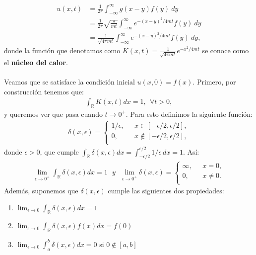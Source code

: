 \documentclass[12pt]{article}
\theoremstyle{definition}
\newcommand*{\field}[1]{\mathbb{#1}}
\begin{document}
\begin{align*}
    u(x,t) & = \frac{1}{2\pi}\int_{-\infty}^{\infty}g(x-y)f(y)\:dy
    \\
    & = \frac{1}{2\pi}\sqrt{\frac{\pi}{mt}}\int_{-\infty}^{\infty}e^{-(x-y)^2/4mt}f(y)\:dy
    \\
    & = \frac{1}{\sqrt{4\pi mt}}\int_{-\infty}^{\infty}e^{-(x-y)^2/4mt}f(y)\:dy,
\end{align*}
donde la función que denotamos como $K(x,t) = \frac{1}{\sqrt{4\pi mt}}e^{-x^2/4mt}$
se conoce como el \textbf{núcleo del calor}.
\\ \\
Veamos que se satisface la condición inicial $u(x,0) = f(x)$. Primero, por construcción tenemos que:
\begin{align}
    \int_{\field{R}}K(x,t)dx = 1, \:\: \forall t>0,
    \label{eq:Chaleur}
\end{align}
y queremos ver que pasa cuando $t \rightarrow 0^{+}$. Para esto definimos la
siguiente función:
\begin{align*}
    \delta(x,\epsilon) = 
    \left\{ \begin{array}{ll}
        1/\epsilon,\:\:\:&x\in[-\epsilon/2,\epsilon/2],
          \\
          0,\:\:\:&x\notin[-\epsilon/2,\epsilon/2],
          \\
         \end{array}
         \label{eq:EcCalor}
\right.
\end{align*}
donde $\epsilon > 0$, que cumple $\int_{\field{R}}\delta(x,\epsilon)dx = \int_{-\epsilon/2}^{\epsilon/2}1/\epsilon\: dx = 1$. Así:
\begin{align*}
    \lim_{\epsilon\to 0^+} \int_{\field{R}}\delta(x,\epsilon)dx = 1 \:\:\: y \:\:\: \lim_{\epsilon\to 0^+} \delta(x,\epsilon) =
    \left\{ \begin{array}{ll}
        \infty,\:\:\:&x = 0,
          \\
          0,\:\:\:&x\neq 0.
          \\
         \end{array}
\right.
\end{align*}
\noindent
Además, suponemos que $\delta(x,\epsilon)$ cumple  las siguientes dos propiedades:
\begin{enumerate}[1.]
    \item $\lim_{\epsilon\to 0}\int_{\field{R}}\delta(x,\epsilon)dx = 1$
    \item $\lim_{\epsilon\to 0}\int_{\field{R}}\delta(x,\epsilon)f(x)dx = f(0)$
    \item
    $\lim_{\epsilon\to 0}\int_{a}^{b}\delta(x,\epsilon)dx = 0$\: si\: $0\notin[a,b]$
\end{enumerate}
\end{document}
